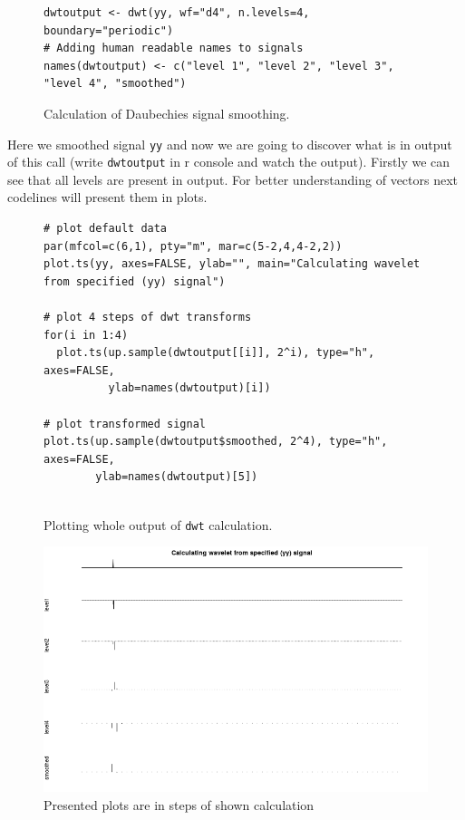 \documentclass{article}
\begin{document}
\begin{figure}[h!]
\begin{lstlisting}
dwtoutput <- dwt(yy, wf="d4", n.levels=4, boundary="periodic")
# Adding human readable names to signals
names(dwtoutput) <- c("level 1", "level 2", "level 3", "level 4", "smoothed")
\end{lstlisting}
\caption{Calculation of Daubechies signal smoothing.}
\label{code:dwt}
\end{figure}

Here we smoothed signal \texttt{yy} and now we are going to discover what is in output of this call (write \texttt{dwtoutput} in r console and watch the output). Firstly we can see that all levels are present in output. For better understanding of vectors next codelines will present them in plots.

\pagebreak

\begin{figure}[h!]
\begin{lstlisting}
# plot default data
par(mfcol=c(6,1), pty="m", mar=c(5-2,4,4-2,2))
plot.ts(yy, axes=FALSE, ylab="", main="Calculating wavelet from specified (yy) signal")

# plot 4 steps of dwt transforms
for(i in 1:4)
  plot.ts(up.sample(dwtoutput[[i]], 2^i), type="h", axes=FALSE,
          ylab=names(dwtoutput)[i])

# plot transformed signal
plot.ts(up.sample(dwtoutput$smoothed, 2^4), type="h", axes=FALSE,
        ylab=names(dwtoutput)[5])


\end{lstlisting}
\caption{Plotting whole output of \texttt{dwt} calculation.}
\label{code:plotting}
\end{figure}

\begin{figure}[h!]
\centering
\includegraphics[scale=0.55]{processed-signal.png}
\caption{Presented plots are in steps of shown calculation}
\label{fig:plotting-fig}
\end{figure}
\end{document}
